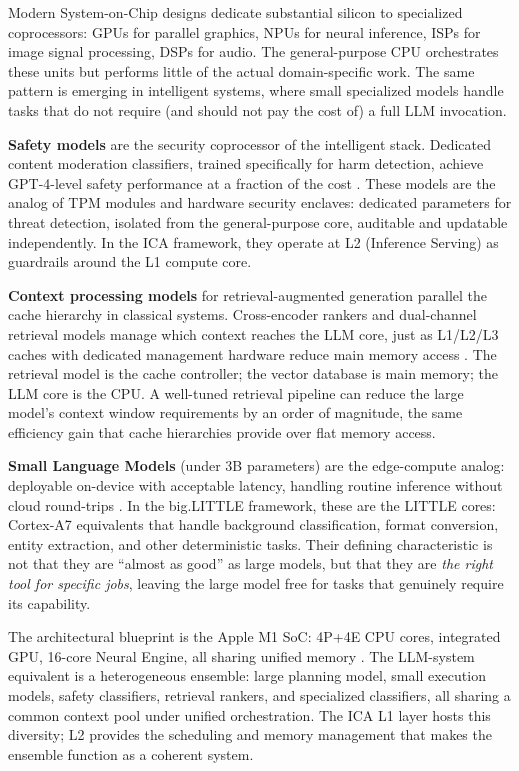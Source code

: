 Modern System-on-Chip designs dedicate substantial silicon to specialized coprocessors: GPUs for parallel graphics, NPUs for neural inference, ISPs for image signal processing, DSPs for audio. The general-purpose CPU orchestrates these units but performs little of the actual domain-specific work. The same pattern is emerging in intelligent systems, where small specialized models handle tasks that do not require (and should not pay the cost of) a full LLM invocation.

\textbf{Safety models} are the security coprocessor of the intelligent stack. Dedicated content moderation classifiers, trained specifically for harm detection, achieve GPT-4-level safety performance at a fraction of the cost \cite{harmbench_2024, airbench_2024}. These models are the analog of TPM modules and hardware security enclaves: dedicated parameters for threat detection, isolated from the general-purpose core, auditable and updatable independently. In the ICA framework, they operate at L2 (Inference Serving) as guardrails around the L1 compute core.

\textbf{Context processing models} for retrieval-augmented generation parallel the cache hierarchy in classical systems. Cross-encoder rankers and dual-channel retrieval models manage which context reaches the LLM core, just as L1/L2/L3 caches with dedicated management hardware reduce main memory access \cite{slm_edge_2025}. The retrieval model is the cache controller; the vector database is main memory; the LLM core is the CPU. A well-tuned retrieval pipeline can reduce the large model's context window requirements by an order of magnitude, the same efficiency gain that cache hierarchies provide over flat memory access.

\textbf{Small Language Models} (under 3B parameters) are the edge-compute analog: deployable on-device with acceptable latency, handling routine inference without cloud round-trips \cite{llama32_2024, phi3_2024}. In the big.LITTLE framework, these are the LITTLE cores: Cortex-A7 equivalents that handle background classification, format conversion, entity extraction, and other deterministic tasks. Their defining characteristic is not that they are ``almost as good'' as large models, but that they are \textit{the right tool for specific jobs}, leaving the large model free for tasks that genuinely require its capability.

The architectural blueprint is the Apple M1 SoC: 4P+4E CPU cores, integrated GPU, 16-core Neural Engine, all sharing unified memory \cite{apple_m1_2020}. The LLM-system equivalent is a heterogeneous ensemble: large planning model, small execution models, safety classifiers, retrieval rankers, and specialized classifiers, all sharing a common context pool under unified orchestration. The ICA L1 layer hosts this diversity; L2 provides the scheduling and memory management that makes the ensemble function as a coherent system.

